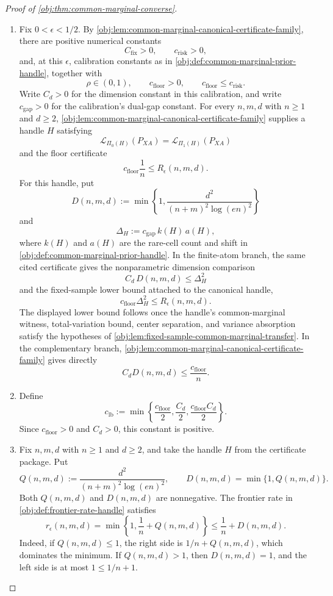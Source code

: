 \begin{proof}[Proof of \cref{obj:thm:common-marginal-converse}]
\begin{enumerate}
\item Fix \(0<\epsilon<1/2\).  By \cref{obj:lem:common-marginal-canonical-certificate-family}, there are positive numerical constants
\[
C_{\mathrm{fix}}>0,\qquad c_{\mathrm{risk}}>0,
\]
and, at this \(\epsilon\), calibration constants as in \cref{obj:def:common-marginal-prior-handle}, together with
\[
\rho\in(0,1),\qquad c_{\mathrm{floor}}>0,
\qquad c_{\mathrm{floor}}\le c_{\mathrm{risk}}.
\]
Write \(C_d>0\) for the dimension constant in this calibration, and write \(c_{\mathrm{gap}}>0\) for the calibration's dual-gap constant.  For every \(n,m,d\) with \(n\ge1\) and \(d\ge2\), \cref{obj:lem:common-marginal-canonical-certificate-family} supplies a handle \(H\) satisfying
\[
\mathcal L_{\Pi_0(H)}(P_{XA})
=
\mathcal L_{\Pi_1(H)}(P_{XA})
\]
and the floor certificate
\[
c_{\mathrm{floor}}\frac1n\le R_\epsilon(n,m,d).
\]
For this handle, put
\[
D(n,m,d):=
\min\left\{1,\frac{d^2}{(n+m)^2\log(en)^2}\right\}
\]
and
\[
\Delta_H:=c_{\mathrm{gap}}\,k(H)\,a(H),
\]
where \(k(H)\) and \(a(H)\) are the rare-cell count and shift in \cref{obj:def:common-marginal-prior-handle}.  In the finite-atom branch, the same cited certificate gives the nonparametric dimension comparison
\[
C_d\,D(n,m,d)\le \Delta_H^2
\]
and the fixed-sample lower bound attached to the canonical handle,
\[
c_{\mathrm{floor}}\Delta_H^2\le R_\epsilon(n,m,d).
\]
The displayed lower bound follows once the handle's common-marginal witness, total-variation bound, center separation, and variance absorption satisfy the hypotheses of \cref{obj:lem:fixed-sample-common-marginal-transfer}.
In the complementary branch, \cref{obj:lem:common-marginal-canonical-certificate-family} gives directly
\[
C_dD(n,m,d)\le \frac{c_{\mathrm{floor}}}{n}.
\] %

\item Define
\[
c_{\mathrm{lb}}:=
\min\left\{
\frac{c_{\mathrm{floor}}}{2},
\frac{C_d}{2},
\frac{c_{\mathrm{floor}}C_d}{2}
\right\}.
\]
Since \(c_{\mathrm{floor}}>0\) and \(C_d>0\), this constant is positive. %

\item Fix \(n,m,d\) with \(n\ge1\) and \(d\ge2\), and take the handle \(H\) from the certificate package.  Put
\[
Q(n,m,d):=
\frac{d^2}{(n+m)^2\log(en)^2},
\qquad
D(n,m,d)=\min\{1,Q(n,m,d)\}.
\]
Both \(Q(n,m,d)\) and \(D(n,m,d)\) are nonnegative.  The frontier rate in \cref{obj:def:frontier-rate-handle} satisfies
\[
r_\epsilon(n,m,d)
=
\min\left\{1,\frac1n+Q(n,m,d)\right\}
\le
\frac1n+D(n,m,d).
\]
Indeed, if \(Q(n,m,d)\le1\), the right side is \(1/n+Q(n,m,d)\), which dominates the minimum.  If \(Q(n,m,d)>1\), then \(D(n,m,d)=1\), and the left side is at most \(1\le 1/n+1\). %


\end{enumerate}
\end{proof}
